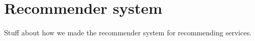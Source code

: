 \section{Recommender system}

Stuff about how we made the recommender system for recommending services.